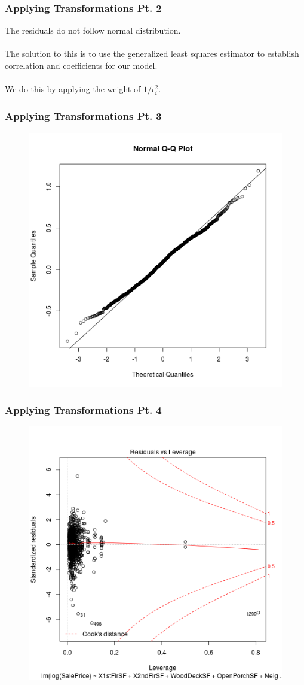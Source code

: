 \documentclass{beamer}
\begin{document}
\begin{frame}
  \frametitle{Applying Transformations Pt. 2}
  The residuals do not follow normal distribution. \\~\\
  The solution to this is to use the generalized least squares estimator to establish correlation and coefficients for our model.\\~\\
  We do this by applying the weight of $1/\epsilon_i^2$.
  
  \end{frame}


  \begin{frame}
\frametitle{Applying Transformations Pt. 3}
\begin{figure}
\includegraphics[width=0.75\linewidth,keepaspectratio=true]{img/weightedModel.png}
\end{figure}
\end{frame}

\begin{frame}
\frametitle{Applying Transformations Pt. 4}
\begin{figure}
\includegraphics[width=0.75\linewidth,keepaspectratio=true]{img/outincrvl.png}
\end{figure}
\end{frame}
\end{document}
